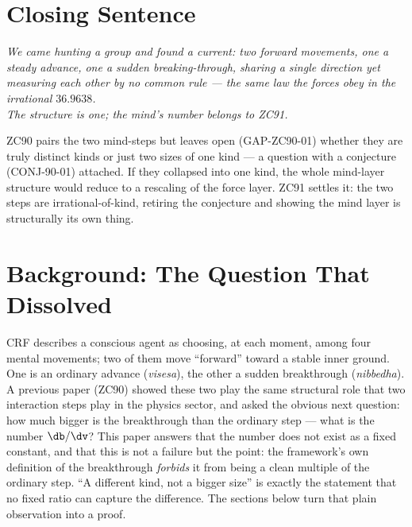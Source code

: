\documentclass[12pt, a4paper]{article}
\begin{document}
\section{Closing Sentence}

\bigskip
\begin{center}
\textit{%
  We came hunting a group and found a current: two forward movements,
  one a steady advance, one a sudden breaking-through, sharing a single
  direction yet measuring each other by no common rule --- the same law
  the forces obey in the irrational $36.9638$.\\[0.3em]
  The structure is one; the mind's number belongs to ZC91.
}
\end{center}



\noindent
ZC90 pairs the two mind-steps but leaves open (GAP-ZC90-01) whether they are
truly distinct kinds or just two sizes of one kind --- a question with a
conjecture (CONJ-90-01) attached. If they collapsed into one kind, the whole
mind-layer structure would reduce to a rescaling of the force layer. ZC91
settles it: the two steps are irrational-of-kind, retiring the conjecture and
showing the mind layer is structurally its own thing.
\section{Background: The Question That Dissolved}
\label{sec:background-zc91}

CRF describes a conscious agent as choosing, at each moment, among four
mental movements; two of them move ``forward'' toward a stable inner
ground. One is an ordinary advance (\emph{visesa}), the other a sudden
breakthrough (\emph{nibbedha}). A previous paper (ZC90) showed these two
play the same structural role that two interaction steps play in the
physics sector, and asked the obvious next question: how much bigger is
the breakthrough than the ordinary step --- what is the number
$\db/\dv$? This paper answers that the number does not exist as a fixed
constant, and that this is not a failure but the point: the framework's
own definition of the breakthrough \emph{forbids} it from being a clean
multiple of the ordinary step. ``A different kind, not a bigger size'' is
exactly the statement that no fixed ratio can capture the difference. The
sections below turn that plain observation into a proof.
\end{document}
